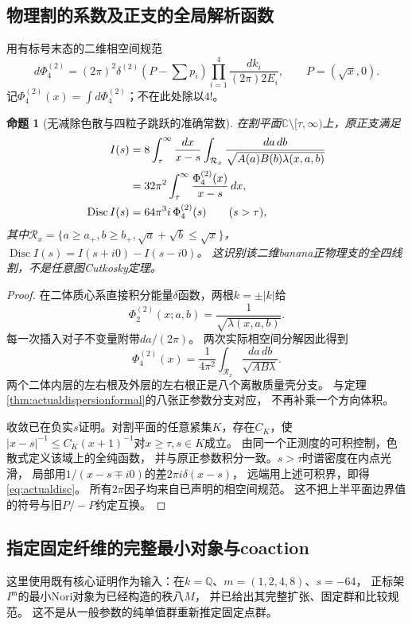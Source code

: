 \documentclass[11pt,a4paper]{ctexart}
\theoremstyle{cnplain}\newtheorem{theorem}{定理}[section]
\newtheorem{proposition}[theorem]{命题}
\theoremstyle{definition}\newtheorem{definition}[theorem]{定义}
\theoremstyle{remark}\newtheorem{remark}[theorem]{注}
\newcommand{\Q}{\mathbb Q}\newcommand{\cC}{\mathcal C}
\begin{document}
\subsection{物理割的系数及正支的全局解析函数}
用有标号末态的二维相空间规范
\[
 d\Phi_4^{(2)}=(2\pi)^2\delta^{(2)}(P-\textstyle\sum p_i)
                    \prod_{i=1}^4\frac{dk_i}{(2\pi)2E_i},
 \qquad P=(\sqrt x,0).
\]
记$\Phi_4^{(2)}(x)=\int d\Phi_4^{(2)}$；不在此处除以$4!$。

\begin{proposition}[无减除色散与四粒子跳跃的准确常数]\label{prop:actualcutnormalization}
在割平面$\mathbb C\setminus[\tau,\infty)$上，原正支满足
\begin{align}
 I(s)&=8\int_{\tau}^{\infty}\frac{dx}{x-s}
       \int_{\mathcal R_x}\frac{da\,db}{\sqrt{A(a)B(b)\lambda(x,a,b)}}
       \notag\\
     &=32\pi^2\int_{\tau}^{\infty}\frac{\Phi_4^{(2)}(x)}{x-s}\,dx,
       \label{eq:actualphysicaldispersion}\\
 \operatorname{Disc}I(s)&=64\pi^3i\,\Phi_4^{(2)}(s)\qquad(s>\tau),
       \label{eq:actualdisc}
\end{align}
其中$\mathcal R_x=\{a\geq a_+,b\geq b_+,\sqrt a+\sqrt b\leq\sqrt x\}$，
$\operatorname{Disc}I(s)=I(s+i0)-I(s-i0)$。
这识别该二维banana正物理支的全四线割，不是任意图Cutkosky定理。
\end{proposition}
\begin{proof}
在二体质心系直接积分能量$\delta$函数，两根$k=\pm|k|$给
\[
 \Phi_2^{(2)}(x;a,b)=\frac1{\sqrt{\lambda(x,a,b)}}.
\]
每一次插入对子不变量附带$da/(2\pi)$。
两次实际相空间分解因此得到
\[
 \Phi_4^{(2)}(x)=\frac1{4\pi^2}
       \int_{\mathcal R_x}\frac{da\,db}{\sqrt{A B\lambda}}.
\]
两个二体内层的左右根及外层的左右根正是八个离散质量壳分支。
与定理\ref{thm:actualdispersionformal}的八张正参数分支对应，
不再补乘一个方向体积。

收敛已在负实$s$证明。对割平面的任意紧集$K$，存在$C_K$，使
$|x-s|^{-1}\leq C_K(x+1)^{-1}$对$x\geq\tau,s\in K$成立。
由同一个正测度的可积控制，色散式定义该域上的全纯函数，
并与原正参数积分一致。$s>\tau$时谱密度在内点光滑，
局部用$1/(x-s\mp i0)$的差$2\pi i\delta(x-s)$，
远端用上述可积界，即得\eqref{eq:actualdisc}。
所有$2\pi$因子均来自已声明的相空间规范。
这不把上半平面边界值的符号与旧$P/-P$约定互换。
\end{proof}

\subsection{指定固定纤维的完整最小对象与coaction}
这里使用既有核心证明作为输入：在$k=\Q$、$m=(1,2,4,8)$、$s=-64$，
正标架$I^{\mathfrak m}$的最小Nori对象为已经构造的秩八$M$，
并已给出其完整扩张、固定群和比较规范。
这不是从一般参数的纯单值群重新推定固定点群。
\end{document}
